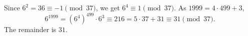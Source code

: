 Since $6^2=36\equiv-1\pmod{37}$, we get $6^4\equiv1\pmod{37}$. As $1999=4\cdot499+3$,
\[
6^{1999}=\left(6^4\right)^{499}\cdot6^3\equiv216=5\cdot37+31\equiv31\pmod{37}.
\]
The remainder is $\boxed{31}$.
